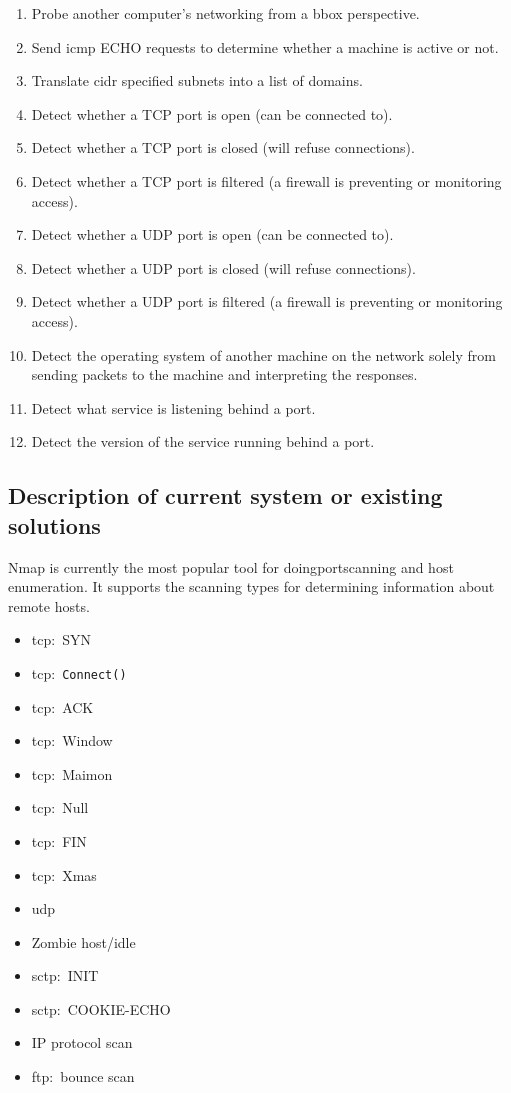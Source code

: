 \documentclass[titlepage]{article}
\let\Oldsubsection\subsection{}
\renewcommand{\subsection}{\FloatBarrier\Oldsubsection}
\begin{document}
\begin{enumerate}

  \item{%
    Probe another computer's networking from a \gls{bbox} perspective.
  }
  \item{%
    Send \gls{icmp} ECHO requests to determine whether a machine is active
    or not.
  }
  \item{%
    Translate \gls{cidr} specified subnets into a list of domains.
  }
  \item{%
    Detect whether a TCP port is open (can be connected to).
  }
  \item{%
    Detect whether a TCP port is closed (will refuse connections).
  }
  \item{%
    Detect whether a TCP port is filtered (a firewall is
    preventing or monitoring access).
  }
  \item{%
    Detect whether a UDP port is open (can be connected to).
  }
  \item{%
    Detect whether a UDP port is closed (will refuse connections).
  }
  \item{%
    Detect whether a UDP port is filtered (a firewall is
    preventing or monitoring access).
  }
  \item{%
    Detect the operating system of another machine on the network
    solely from sending packets to the machine and interpreting the responses.
  }
  \item{%
    Detect what service is listening behind a port.
  }
  \item{%
    Detect the version of the service running behind a port.
  }

\end{enumerate}

\subsection{Description of current system or existing solutions}

Nmap is currently the most popular tool for doing\gls{port}scanning and host enumeration.
It supports the scanning types for determining information about remote hosts.

\begin{itemize}
  \item{\gls{tcp}:\ SYN}
  \item{\gls{tcp}:\ \verb|Connect()|}
  \item{\gls{tcp}:\ ACK}
  \item{\gls{tcp}:\ Window}
  \item{\gls{tcp}:\ Maimon}
  \item{\gls{tcp}:\ Null}
  \item{\gls{tcp}:\ FIN}
  \item{\gls{tcp}:\ Xmas}
  \item{\gls{udp}}
  \item{Zombie host/idle}
  \item{\gls{sctp}:\ INIT}
  \item{\gls{sctp}:\ COOKIE-ECHO}
  \item{IP protocol scan}
  \item{\gls{ftp}:\ bounce scan}
\end{itemize}
\end{document}
